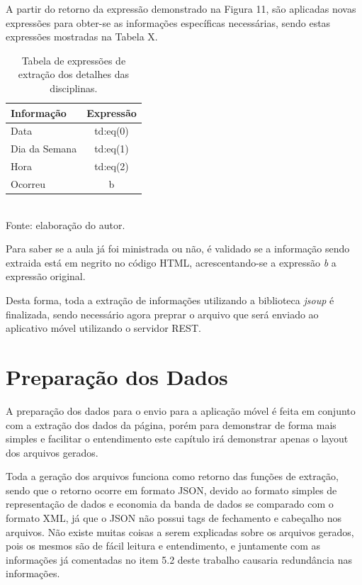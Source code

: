 \newpage

A partir do retorno da expressão demonstrado na Figura 11, são aplicadas novas expressões para obter-se as informações específicas necessárias, sendo estas expressões mostradas na Tabela X.

\begin{table}[!hbt]
\centering
\caption[Extração de Informações - Expressões de Extração dos Detalhes da Disciplina]{Tabela de expressões de extração dos detalhes das disciplinas.}
\vspace{3mm}
\begin{tabular}{p{3cm}|c}\hline
\bf{Informação} & \bf{Expressão}                                 \\ \hline
Data            & td:eq(0) \\ \hline
Dia da Semana   & td:eq(1) \\ \hline
Hora            & td:eq(2) \\ \hline
Ocorreu         & b        \\ \hline
\end{tabular}
\\ Fonte: elaboração do autor.
\end{table}

Para saber se a aula já foi ministrada ou não, é validado se a informação sendo extraida está em negrito no código HTML, acrescentando-se a expressão \emph{b} a expressão original.

Desta forma, toda a extração de informações utilizando a biblioteca \emph{jsoup} é finalizada, sendo necessário agora preprar o arquivo que será enviado ao aplicativo móvel utilizando o servidor REST.

\section{Preparação dos Dados}
A preparação dos dados para o envio para a aplicação móvel é feita em conjunto com a extração dos dados da página, porém para demonstrar de forma mais simples e facilitar o entendimento este capítulo irá demonstrar apenas o layout dos arquivos gerados. 

Toda a geração dos arquivos funciona como retorno das funções de extração, sendo que o retorno ocorre em formato JSON, devido ao formato simples de representação de dados e economia da banda de dados se comparado com o formato XML, já que o JSON não possui tags de fechamento e cabeçalho nos arquivos. Não existe muitas coisas a serem explicadas sobre os arquivos gerados, pois os mesmos são de fácil leitura e entendimento, e juntamente com as informações já comentadas no item 5.2 deste trabalho causaria redundância nas informações.

